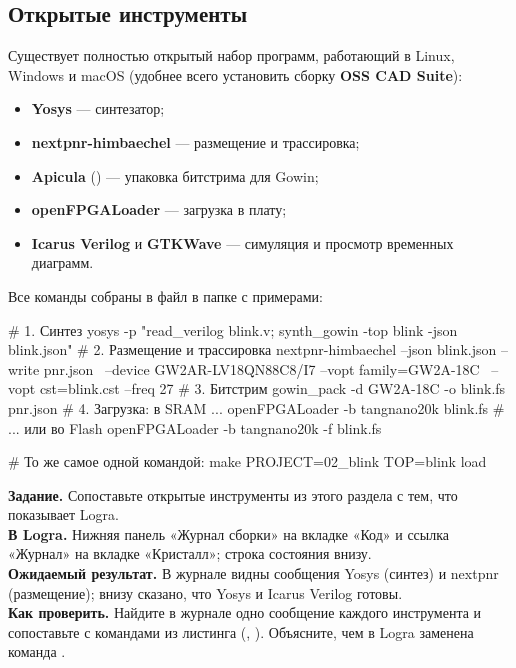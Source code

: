 \subsection{Открытые инструменты}

Существует полностью открытый набор программ, работающий в Linux, Windows и macOS
(удобнее всего установить сборку \textbf{OSS CAD Suite}):
\begin{itemize}
  \item \textbf{Yosys} --- синтезатор;
  \item \textbf{nextpnr-himbaechel} --- размещение и трассировка;
  \item \textbf{Apicula} () --- упаковка битстрима для Gowin;
  \item \textbf{openFPGALoader} --- загрузка в плату;
  \item \textbf{Icarus Verilog} и \textbf{GTKWave} --- симуляция и
        просмотр временных диаграмм.
\end{itemize}

Все команды собраны в файл  в папке с примерами:
\begin{vcode}[bash]
# 1. Синтез
yosys -p "read_verilog blink.v; synth_gowin -top blink -json blink.json"
# 2. Размещение и трассировка
nextpnr-himbaechel --json blink.json --write pnr.json \
    --device GW2AR-LV18QN88C8/I7 --vopt family=GW2A-18C \
    --vopt cst=blink.cst --freq 27
# 3. Битстрим
gowin_pack -d GW2A-18C -o blink.fs pnr.json
# 4. Загрузка: в SRAM ...
openFPGALoader -b tangnano20k blink.fs
# ... или во Flash
openFPGALoader -b tangnano20k -f blink.fs

# То же самое одной командой:
make PROJECT=02_blink TOP=blink load
\end{vcode}

\begin{diybox}
\textbf{Задание.} Сопоставьте открытые инструменты из этого раздела с тем, что показывает Logra.\\
\textbf{В Logra.} Нижняя панель «Журнал сборки» на вкладке «Код» и ссылка «Журнал» на вкладке «Кристалл»; строка состояния внизу.\\
\textbf{Ожидаемый результат.} В журнале видны сообщения Yosys (синтез) и nextpnr (размещение); внизу сказано, что Yosys и Icarus Verilog готовы.\\
\textbf{Как проверить.} Найдите в журнале одно сообщение каждого инструмента и сопоставьте с командами из листинга (\code{yosys}, ).  Объясните, чем в Logra заменена команда .
\end{diybox}


